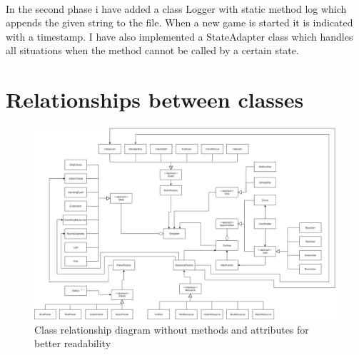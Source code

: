 \documentclass[a4paper,12pt]{article}
\begin{document}
\\
In the second phase i have added a class Logger with static method log which appends the given string to the file. When a new game is started it is indicated with a timestamp. I have also implemented a StateAdapter class which handles all situations when the method cannot be called by a certain state.

\section{Relationships between classes}
\begin{figure}[H]
	\caption{Class relationship diagram without methods and attributes for better readability}
	\includegraphics[scale=0.25]{ClassRelationship.png}
\end{figure}
\end{document}
